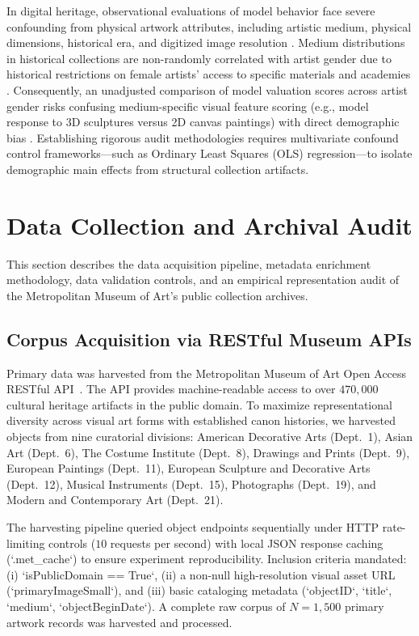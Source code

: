 \documentclass[pdflatex,sn-mathphys-num]{sn-jnl}%
\theoremstyle{thmstyleone}%
\theoremstyle{thmstyletwo}%
\theoremstyle{thmstylethree}%
\begin{document}
In digital heritage, observational evaluations of model behavior face severe confounding from physical artwork attributes, including artistic medium, physical dimensions, historical era, and digitized image resolution \cite{fiorucci2020machine, meier2021gender}. Medium distributions in historical collections are non-randomly correlated with artist gender due to historical restrictions on female artists' access to specific materials and academies \cite{topaz2019diversity, bailey2020gender}. Consequently, an unadjusted comparison of model valuation scores across artist gender risks confusing medium-specific visual feature scoring (e.g., model response to 3D sculptures versus 2D canvas paintings) with direct demographic bias \cite{hall2023auditing}. Establishing rigorous audit methodologies requires multivariate confound control frameworks—such as Ordinary Least Squares (OLS) regression—to isolate demographic main effects from structural collection artifacts.


\section{Data Collection and Archival Audit}
\label{sec:data_collection}

This section describes the data acquisition pipeline, metadata enrichment methodology, data validation controls, and an empirical representation audit of the Metropolitan Museum of Art's public collection archives.

\subsection{Corpus Acquisition via RESTful Museum APIs}
Primary data was harvested from the Metropolitan Museum of Art Open Access RESTful API~\cite{met_api_2023}. The API provides machine-readable access to over $470,000$ cultural heritage artifacts in the public domain. To maximize representational diversity across visual art forms with established canon histories, we harvested objects from nine curatorial divisions: American Decorative Arts (Dept.\ 1), Asian Art (Dept.\ 6), The Costume Institute (Dept.\ 8), Drawings and Prints (Dept.\ 9), European Paintings (Dept.\ 11), European Sculpture and Decorative Arts (Dept.\ 12), Musical Instruments (Dept.\ 15), Photographs (Dept.\ 19), and Modern and Contemporary Art (Dept.\ 21).

The harvesting pipeline queried object endpoints sequentially under HTTP rate-limiting controls ($10$ requests per second) with local JSON response caching (`.met\_cache`) to ensure experiment reproducibility. Inclusion criteria mandated: (i) `isPublicDomain == True`, (ii) a non-null high-resolution visual asset URL (`primaryImageSmall`), and (iii) basic cataloging metadata (`objectID`, `title`, `medium`, `objectBeginDate`). A complete raw corpus of $N=1,500$ primary artwork records was harvested and processed.
\end{document}
